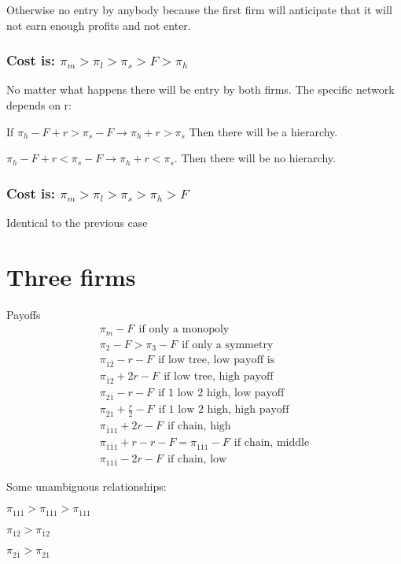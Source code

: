 \documentclass{article}
\begin{document}
Otherwise no entry by anybody because the first firm will anticipate that it will not earn enough profits and not enter.

\subsubsection*{Cost is: $\pi_m>\pi_l>\pi_s>F>\pi_h$}
No matter what happens there will be entry by both firms. The specific network depends on r:

If $ \pi_h -F+r>\pi_s -F \rightarrow \pi_h+r>\pi_s $
Then there will be a hierarchy. 

$\pi_h -F+r<\pi_s -F \rightarrow \pi_h+r<\pi_s$. Then there will be no hierarchy. 

\subsubsection*{Cost is: $\pi_m>\pi_l>\pi_s>\pi_h>F$}
Identical to the previous case

\section{Three firms}
Payoffs
\begin{align*}
    \pi_{m} -F ~~\text{if only a monopoly} \\
    \pi_{2} -F>\pi_{3} -F  ~~\text{if only a symmetry}\\ 
    \pi_{1 \overline{2}}-r-F  ~~\text{if low tree, low payoff is} \\
    \pi_{\overline{1}2}+2r-F  ~~\text{if low tree, high payoff} \\
    \pi_{2 \overline{1}} -r-F  ~~\text{if 1 low 2 high, low payoff} \\
    \pi_{\overline{2} 1 }+\frac{r}{2}-F  ~~\text{if 1 low 2 high, high payoff} \\
    \pi_{\overline{1}11}  +2 r-F  ~~\text{if chain, high} \\
    \pi_{1 \overline{1}1} + r-r-F=\pi_{1 \overline{1}1} -F  ~~\text{if chain, middle} \\
    \pi_{11 \overline{1}} -2r-F  ~~\text{if chain, low}
\end{align*}

Some unambiguous relationships: 

$\pi_{11 \overline{1}}>\pi_{1 \overline{1}1}>\pi_{\overline{1}11}$

$\pi_{1 \overline{2}}>\pi_{\overline{1}2}$

$\pi_{2 \overline{1}}>\pi_{\overline{2}1}$
\end{document}
